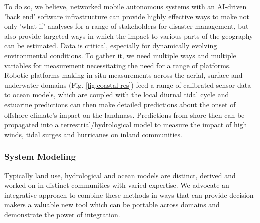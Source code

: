 To do so, we believe, networked mobile autonomous systems with an
AI-driven 'back end' software infrastructure can provide highly
effective ways to make not only 'what if' analyses for a range of
stakeholders for disaster management, but also provide targeted ways
in which the impact to various parts of the geography can be
estimated. Data is critical, especially for dynamically evolving
environmental conditions. To gather it, we need multiple ways and
multiple variables for measurement necessitating the need for a range
of platforms. Robotic platforms making in-situ measurements across the
aerial, surface and underwater domains (Fig. \ref{fig:coastal-res})
feed a range of calibrated sensor data to ocean models, which are
coupled with the local diurnal tidal cycle and estuarine predictions
can then make detailed predictions about the onset of offshore
climate's impact on the landmass. Predictions from shore then can be
propagated into a terrestrial/hydrological model to measure the impact
of high winds, tidal surges and hurricanes on inland communities.


\subsubsection*{System Modeling}

Typically land use, hydrological and ocean models are distinct,
derived and worked on in distinct communities with varied expertise.
We advocate an integrative approach to combine these methods in ways
that can provide decision-makers a valuable new tool which can be
portable across domains and demonstrate the power of integration.




